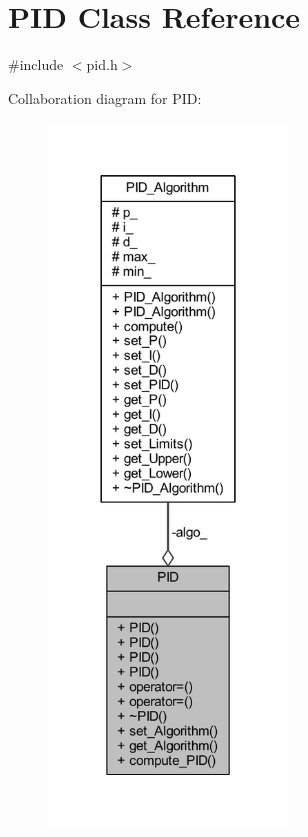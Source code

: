 \hypertarget{class_p_i_d}{}\section{P\+ID Class Reference}
\label{class_p_i_d}


{\ttfamily \#include $<$pid.\+h$>$}



Collaboration diagram for P\+ID\+:
\nopagebreak
\begin{figure}[H]
\begin{center}
\leavevmode
\includegraphics[width=180pt]{class_p_i_d__coll__graph}
\end{center}
\end{figure}
